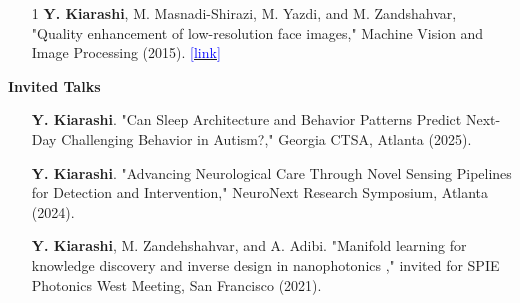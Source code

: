 \documentclass[margin, line]{res}
\newenvironment{list1}{
  \begin{list}{\ding{113}}{%
      \setlength{\itemsep}{0in}
      \setlength{\parsep}{0in} \setlength{\parskip}{0in}
      \setlength{\topsep}{0in} \setlength{\partopsep}{0in} 
      \setlength{\leftmargin}{0.17in}}}{\end{list}}
\begin{document}
\begin{resume}
\begin{list1}
\begin{itemize}
\item [1] \textbf{Y. Kiarashi}, M. Masnadi-Shirazi, M. Yazdi, and M. Zandshahvar, "Quality enhancement of low-resolution face images," Machine Vision and Image Processing (2015). \href{https://ieeexplore.ieee.org/abstract/document/7397542}{\textcolor{blue}{[link]}}

\end{itemize}
\end{list1}



\begin{list1}
\item[] \textbf{Invited Talks}
\begin{itemize}



\item []\textbf{Y. Kiarashi}. "Can Sleep Architecture and Behavior Patterns Predict Next-Day Challenging Behavior in Autism?," Georgia CTSA, Atlanta (2025).
\item []\textbf{Y. Kiarashi}. "Advancing Neurological Care Through Novel Sensing Pipelines for Detection and Intervention," NeuroNext Research Symposium, Atlanta (2024).
\item []\textbf{Y. Kiarashi}, M. Zandehshahvar, and A. Adibi. "Manifold learning for knowledge discovery and inverse design in nanophotonics ," invited for SPIE Photonics West Meeting, San Francisco (2021).



\end{itemize}
\end{list1}
\end{resume}
\end{document}
